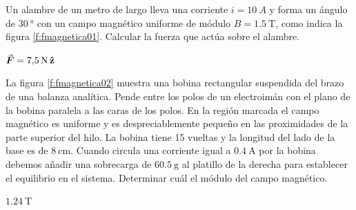 \setcounter{figure}{0}

\begin{Exercise}\label{p:fmagnetica01}
  Un alambre de un metro de largo lleva una corriente $i = \SI{10}{A}$ y forma un ángulo de $\SI{30}{\degree}$ con un campo magnético uniforme de módulo $B = \SI{1.5}{\tesla}$, como indica la figura \ref{f:fmagnetica01}. Calcular la fuerza que actúa sobre el alambre.
\end{Exercise}
\begin{Answer}
  $\va*{F} = \SI{7.5}{\newton}\,\vu{z}$
\end{Answer}
%
\begin{center}
\end{center}
%
\begin{Exercise}\label{p:fmagnetica02}
  La figura \ref{f:fmagnetica02} muestra una bobina rectangular suspendida del brazo de una balanza analítica. Pende entre los polos de un electroimán con el plano de la bobina paralela a las caras de los polos. En la región marcada el campo magnético es uniforme y es despreciablemente pequeño en las proximidades de la parte superior del hilo. La bobina tiene 15 vueltas y la longitud del lado de la base es de $\SI{8}{\centi\metre}$. Cuando circula una corriente igual a $\SI{0.4}{\ampere}$ por la bobina debemos añadir una sobrecarga de $\SI{60.5}{\gram}$ al platillo de la derecha para establecer el equilibrio en el sistema. Determinar cuál el módulo del campo magnético.
\end{Exercise}
\begin{Answer}
  $\SI{1.24}{\tesla}$
\end{Answer}
